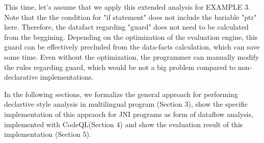 This time, let's assume that we apply this extended analysis for EXAMPLE 3.
Note that the the condition for "if statement" does not include the bariable
"ptr" here.  Therefore, the datafact regarding "guard" does not need to be
calculated from the beggining. Depending on the optimization of the evaluation
engine, this guard can be effectively precluded from the data-facts
calculation, which can save some time.  Even without the optimization, the
programmer can manually modify the rules regarding guard, which would be not a
big problem compared to non-declarative implementations.

In the following sections, we formalize the general approach for performing
declartive style analysis in multilingual program (Section 3), show the
specific implementation of this appraoch for JNI programs as form of dataflow
analysis, implemented with CodeQL(Section 4) and show the evaluation result of
this implementation (Section 5).
